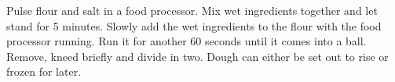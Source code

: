 \begin{recipe}
Pulse flour and salt in a food processor. Mix wet ingredients together and
let stand for 5 minutes. Slowly add the wet ingredients to the flour with the
food processor running. Run it for another 60 seconds until it comes into a
ball. Remove, kneed briefly and divide in two. Dough can either be set out
to rise or frozen for later.

\end{recipe}
